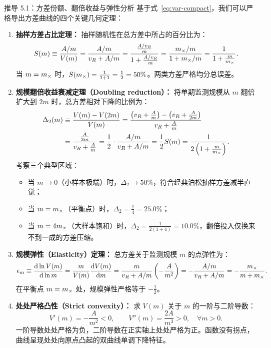 \begin{derivationbox}{推导 5.1：方差份额、翻倍收益与弹性分析}
基于式~\eqref{eq:var-compact}，我们可以严格导出方差曲线的四个关键几何定理：

\begin{enumerate}
  \item \textbf{抽样方差占比定理：}
  抽样随机性在总方差中所占的百分比为：
  \begin{equation}
    S(m) \equiv \frac{A/m}{V(m)} = \frac{A/m}{v_R + A/m} = \frac{\frac{A/v_R}{m}}{1 + \frac{A/v_R}{m}} = \frac{m_\times/m}{1 + m_\times/m} = \frac{1}{1 + \frac{m}{m_\times}}.
    \label{eq:share-proof}
  \end{equation}
  当 $m = m_\times$ 时，$S(m_\times) = \frac{1}{1 + 1} = \frac{1}{2} = 50\%$。两类方差严格均分总误差。

  \item \textbf{规模翻倍收益衰减定理（Doubling reduction）：}
  将单期监测规模从 $m$ 翻倍扩大到 $2m$ 时，总方差相对下降的比例为：
  \begin{align}
    \Delta_2(m) &\equiv \frac{V(m) - V(2m)}{V(m)} = \frac{\left(v_R + \frac{A}{m}\right) - \left(v_R + \frac{A}{2m}\right)}{v_R + \frac{A}{m}} \nonumber \\
    &= \frac{\frac{A}{2m}}{v_R + \frac{A}{m}} = \frac{1}{2} \cdot \frac{A/m}{v_R + A/m} = \frac{1}{2} S(m) = \frac{1}{2\left(1 + \frac{m}{m_\times}\right)}.
    \label{eq:doubling-proof}
  \end{align}
  考察三个典型区域：
  \begin{itemize}
    \item 当 $m \to 0$（小样本极端）时，$\Delta_2 \to 50\%$，符合经典泊松抽样方差减半直觉；
    \item 当 $m = m_\times$（平衡点）时，$\Delta_2 = \frac{1}{4} = 25.0\%$；
    \item 当 $m = 4m_\times$（大样本饱和）时，$\Delta_2 = \frac{1}{2(1+4)} = 10.0\%$，翻倍投入仅换来不到一成的方差压缩。
  \end{itemize}

  \item \textbf{规模弹性（Elasticity）定理：}
  总方差关于监测规模 $m$ 的点弹性为：
  \begin{equation}
    \epsilon_m \equiv \frac{\mathrm{d}\ln V(m)}{\mathrm{d}\ln m} = \frac{m}{V(m)} \frac{\mathrm{d}V(m)}{\mathrm{d}m} = \frac{m}{v_R + A/m} \left( -\frac{A}{m^2} \right) = -\frac{A/m}{v_R + A/m} = -\frac{m_\times}{m + m_\times}.
  \end{equation}
  在平衡点 $m = m_\times$ 处，规模弹性严格等于 $-\frac{1}{2}$。

  \item \textbf{处处严格凸性（Strict convexity）：}
  求 $V(m)$ 关于 $m$ 的一阶与二阶导数：
  \begin{equation}
    V'(m) = -\frac{A}{m^2} < 0, \qquad V''(m) = \frac{2A}{m^3} > 0, \quad \forall m > 0.
  \end{equation}
  一阶导数处处严格为负，二阶导数在正实轴上处处严格为正。函数没有拐点，曲线呈现处处向原点凸起的双曲线单调下降特征。
\end{enumerate}
\end{derivationbox}


